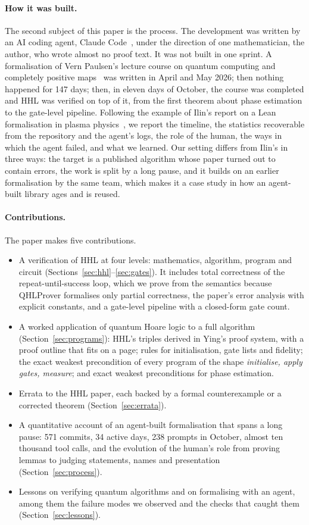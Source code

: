 \paragraph{How it was built.} The second subject of this paper is the process. The development was
written by an AI coding agent, Claude Code~\cite{claudecode}, under the direction of one
mathematician, the author, who wrote almost no proof text. It was not built in one sprint. A
formalisation of Vern Paulsen's lecture course on quantum computing and completely positive
maps~\cite{paulsen2011notes} was written in April and May 2026; then nothing happened for 147 days;
then, in eleven days of October, the course was completed and HHL was verified on top of it, from
the first theorem about phase estimation to the gate-level pipeline. Following the example of Ilin's
report on a Lean formalisation in plasma physics~\cite{ilin2026vml}, we report the timeline, the
statistics recoverable from the repository and the agent's logs, the role of the human, the ways in
which the agent failed, and what we learned. Our setting differs from Ilin's in three ways: the target
is a published algorithm whose paper turned out to contain errors, the work is split by a long
pause, and it builds on an earlier formalisation by the same team, which makes it a case study in
how an agent-built library ages and is reused.

\paragraph{Contributions.} The paper makes five contributions.
\begin{itemize}
\item A verification of HHL at four levels: mathematics, algorithm, program and circuit
(Sections~\ref{sec:hhl}--\ref{sec:gates}). It includes total correctness of the repeat-until-success
loop, which we prove from the semantics because QHLProver formalises only partial correctness, the paper's error analysis with
explicit constants, and a gate-level pipeline with a closed-form gate count.
\item A worked application of quantum Hoare logic to a full algorithm (Section~\ref{sec:programs}):
HHL's triples derived in Ying's proof system, with a proof outline that fits on a page; rules for
initialisation, gate lists and fidelity; the exact weakest precondition of every program of the shape
\emph{initialise, apply gates, measure}; and exact weakest preconditions for phase estimation.
\item Errata to the HHL paper, each backed by a formal counterexample or a corrected theorem
(Section~\ref{sec:errata}).
\item A quantitative account of an agent-built formalisation that spans a long pause: 571 commits,
34 active days, 238 prompts in October, almost ten thousand tool calls, and the evolution of the
human's role from proving lemmas to judging statements, names and presentation
(Section~\ref{sec:process}).
\item Lessons on verifying quantum algorithms and on formalising with an agent, among them
the failure modes we observed and the checks that caught them (Section~\ref{sec:lessons}).
\end{itemize}

